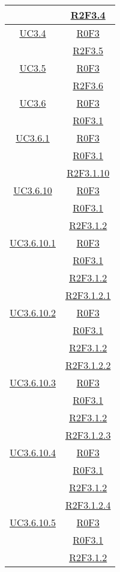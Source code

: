 \begin{longtable}{|c|c|}
& \hyperlink{R2F3.4}{R2F3.4}\\
\hline
\hyperlink{UC3.4}{UC3.4} & \hyperlink{R0F3}{R0F3}\\
& \hyperlink{R2F3.5}{R2F3.5}\\
\hline
\hyperlink{UC3.5}{UC3.5} & \hyperlink{R0F3}{R0F3}\\
& \hyperlink{R2F3.6}{R2F3.6}\\
\hline
\hyperlink{UC3.6}{UC3.6} & \hyperlink{R0F3}{R0F3}\\
& \hyperlink{R0F3.1}{R0F3.1}\\
\hline
\hyperlink{UC3.6.1}{UC3.6.1} & \hyperlink{R0F3}{R0F3}\\
& \hyperlink{R0F3.1}{R0F3.1}\\
& \hyperlink{R2F3.1.10}{R2F3.1.10}\\
\hline
\hyperlink{UC3.6.10}{UC3.6.10} & \hyperlink{R0F3}{R0F3}\\
& \hyperlink{R0F3.1}{R0F3.1}\\
& \hyperlink{R2F3.1.2}{R2F3.1.2}\\
\hline
\hyperlink{UC3.6.10.1}{UC3.6.10.1} & \hyperlink{R0F3}{R0F3}\\
& \hyperlink{R0F3.1}{R0F3.1}\\
& \hyperlink{R2F3.1.2}{R2F3.1.2}\\
& \hyperlink{R2F3.1.2.1}{R2F3.1.2.1}\\
\hline
\hyperlink{UC3.6.10.2}{UC3.6.10.2} & \hyperlink{R0F3}{R0F3}\\
& \hyperlink{R0F3.1}{R0F3.1}\\
& \hyperlink{R2F3.1.2}{R2F3.1.2}\\
& \hyperlink{R2F3.1.2.2}{R2F3.1.2.2}\\
\hline
\hyperlink{UC3.6.10.3}{UC3.6.10.3} & \hyperlink{R0F3}{R0F3}\\
& \hyperlink{R0F3.1}{R0F3.1}\\
& \hyperlink{R2F3.1.2}{R2F3.1.2}\\
& \hyperlink{R2F3.1.2.3}{R2F3.1.2.3}\\
\hline
\hyperlink{UC3.6.10.4}{UC3.6.10.4} & \hyperlink{R0F3}{R0F3}\\
& \hyperlink{R0F3.1}{R0F3.1}\\
& \hyperlink{R2F3.1.2}{R2F3.1.2}\\
& \hyperlink{R2F3.1.2.4}{R2F3.1.2.4}\\
\hline
\hyperlink{UC3.6.10.5}{UC3.6.10.5} & \hyperlink{R0F3}{R0F3}\\
& \hyperlink{R0F3.1}{R0F3.1}\\
& \hyperlink{R2F3.1.2}{R2F3.1.2}\\

\end{longtable}

